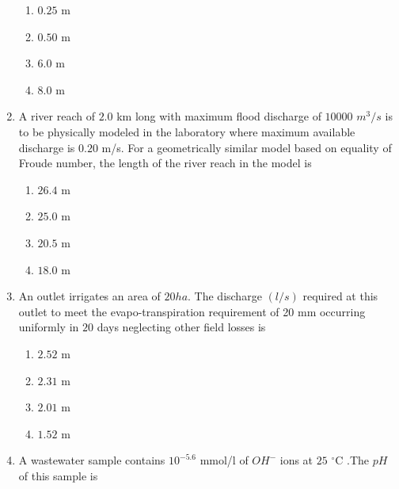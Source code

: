 \documentclass[journal]{IEEEtran}
\begin{document}
\begin{enumerate}
\begin{multicols}{2}

\begin{enumerate}
\item $0.25$ m 
\item $0.50$ m
\item $6.0$ m 
\item $8.0$ m 
\end{enumerate}     
\end{multicols}

\item A river reach of $2.0$ km long with maximum flood discharge of $10000$ $m^{3}/s$ is to be physically modeled in the laboratory where maximum available discharge is $0.20$ m/s. For a geometrically similar model based on equality of Froude number, the length of the river reach  in the model is \textbf{}

\begin{multicols}{2}

\begin{enumerate}
\item $26.4$ m 
\item $25.0$ m
\item $20.5$ m 
\item $18.0$ m 
\end{enumerate}     
\end{multicols}

\item An outlet irrigates an area of $20  ha$. The discharge $(l/s)$ required at this outlet to meet the evapo-transpiration requirement of 20 mm occurring uniformly in $20$ days neglecting other field losses is \textbf{}

\begin{multicols}{2}

\begin{enumerate}
\item $2.52$ m 
\item $2.31$ m
\item $2.01$ m 
\item $1.52$ m 
\end{enumerate}     
\end{multicols}

\item A wastewater sample contains $10^{-5.6}$ mmol/l of $OH^{-}$ ions at $25$ $^\circ\text{C}$ .The $pH$ of this sample is \textbf{}


\end{enumerate}
\end{document}
